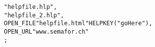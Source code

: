 \label{sec:helpfileexamples}


\begin{boxedminipage}[t]{\linewidth}
\begin{alltt}
\HELPFILE
  "helpfile.hlp",
  "helpfile\_2.hlp",
  OPEN\_FILE "helpfile.html"  HELPKEY("goHere"),
  OPEN\_URL  "www.semafor.ch"
;
\end{alltt}
\end{boxedminipage}
